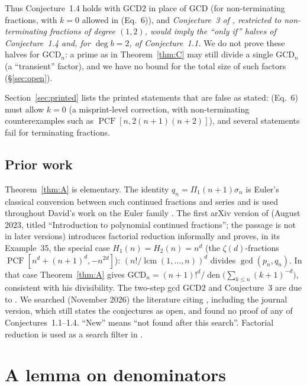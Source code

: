 \documentclass[11pt]{amsart}
\theoremstyle{definition}
\theoremstyle{remark}
\numberwithin{equation}{section}
\newcommand{\PCF}{\operatorname{PCF}}
\newcommand{\GCD}{\mathrm{GCD}}
\newcommand{\den}{\operatorname{den}}
\newcommand{\lcm}{\operatorname{lcm}}
\begin{document}
Thus Conjecture~1.4 holds with $\GCD2$ in place of $\GCD$ (for non-terminating fractions, with $k=0$ allowed in (Eq.~6)), and \emph{Conjecture~3 of \cite{BDNM}, restricted to non-terminating fractions of degree $(1,2)$, would imply the ``only if'' halves of Conjecture~1.4 and, for $\deg b=2$, of Conjecture~1.1.} We do not prove these halves for $\GCD_n$: a prime as in Theorem~\ref{thm:C} may still divide a single $\GCD_n$ (a ``transient'' factor), and we have no bound for the total size of such factors (\S\ref{sec:open}).

Section~\ref{sec:printed} lists the printed statements that are false as stated: (Eq.~6) must allow $k=0$ (a misprint-level correction, with non-terminating counterexamples such as $\PCF[n,2(n+1)(n+2)]$), and several statements fail for terminating fractions.

\subsection{Prior work}
Theorem~\ref{thm:A} is elementary. The identity $q_n=\Pi_1(n+1)\sigma_n$ is Euler's classical conversion between such continued fractions and series and is used throughout David's work on the Euler family \cite{Dav}. The first arXiv version of \cite{Dav} (August 2023, titled ``Introduction to polynomial continued fractions''; the passage is not in later versions) introduces factorial reduction informally and proves, in its Example~35, the special case $H_1(n)=H_2(n)=n^d$ (the $\zeta(d)$-fractions $\PCF[n^d+(n+1)^d,-n^{2d}]$): $(n!/\lcm(1,\dots,n))^d$ divides $\gcd(p_n,q_n)$. In that case Theorem~\ref{thm:A} gives $\GCD_n=(n+1)!^d/\den\bigl(\sum_{k\le n}(k+1)^{-d}\bigr)$, consistent with his divisibility. The two-step gcd $\GCD2$ and Conjecture~3 are due to \cite{BDNM}. We searched (November 2026) the literature citing \cite{BDNM}, including the journal version, which still states the conjectures as open, and found no proof of any of Conjectures~1.1--1.4. ``New'' means ``not found after this search''. Factorial reduction is used as a search filter in \cite{EDCK}.

\section{A lemma on denominators}
\end{document}
